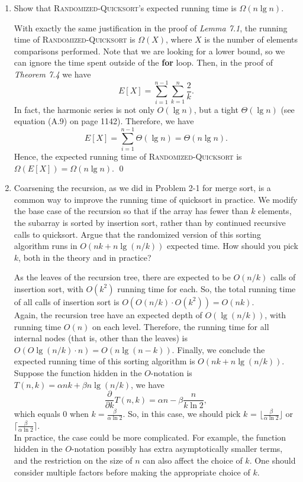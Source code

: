 \documentclass[12pt,reqno]{amsart}
\newif\ifanswer
\begin{document}
\begin{enumerate}[1.]
\item Show that \textsc{Randomized-Quicksort}'s expected running time is $\Omega(n\lg{n})$.

\ifanswer
{}
With exactly the same justification in the proof of \textit{Lemma 7.1}, the running time of \textsc{Randomized-Quicksort} is $\Omega(X)$, where $X$ is the number of elements comparisons performed. Note that we are looking for a lower bound, so we can ignore the time spent outside of the \textbf{for} loop. Then, in the proof of \textit{Theorem 7.4} we have
$$
E[X] = \sum_{i = 1}^{n - 1}\sum_{k = 1}^{n}{\frac{2}{k}}.
$$
In fact, the harmonic series is not only $O(\lg{n})$, but a tight $\Theta(\lg{n})$ (see equation (A.9) on page 1142). Therefore, we have
$$
E[X] = \sum_{i = 1}^{n - 1}{\Theta(\lg{n})} = \Theta{(n\lg{n})}.
$$
Hence, the expected running time of \textsc{Randomized-Quicksort} is $\Omega(E[X]) = \Omega{(n\lg{n})}$. \qed
\vspace{1cm}



\item Coarsening the recursion, as we did in Problem 2-1 for merge sort, is a common way to improve the running time of quicksort in practice. We modify the base case of the recursion so that if the array has fewer than $k$ elements, the subarray is sorted by insertion sort, rather than by continued recursive calls to quicksort. Argue that the randomized version of this sorting algorithm runs in $O(nk + n\lg{(n/k)})$ expected time. How should you pick $k$, both in the theory and in practice?

\ifanswer
{}
As the leaves of the recursion tree, there are expected to be $O(n/k)$ calls of insertion sort, with $O(k^2)$ running time for each. So, the total running time of all calls of insertion sort is $O(O(n/k)\cdot O(k^2)) = O(nk)$.\\
Again, the recursion tree have an expected depth of $O(\lg{(n/k)})$, with running time $O(n)$ on each level. Therefore, the running time for all internal nodes (that is, other than the leaves) is $O(O{\lg{(n/k)}\cdot n}) = O(n\lg{(n - k)})$. Finally, we conclude the expected running time of this sorting algorithm is $O(nk + n\lg{(n/k)})$.\\
Suppose the function hidden in the $O$-notation is $T(n, k) = \alpha nk + \beta n\lg{(n / k)}$, we have
$$
\frac{\partial}{\partial k}{T(n, k)} = \alpha n - \beta\frac{n}{k\ln{2}},
$$
which equals $0$ when $k = \frac{\beta}{\alpha\ln{2}}$. So, in this case, we should pick $k$ = $\lfloor\frac{\beta}{\alpha\ln{2}}\rfloor$ or $\lceil\frac{\beta}{\alpha\ln{2}}\rceil$.\\
In practice, the case could be more complicated. For example, the function hidden in the $O$-notation possibly has extra asymptotically smaller terms, and the restriction on the size of $n$ can also affect the choice of $k$. One should consider multiple factors before making the appropriate choice of $k$.
\vspace{1cm}




\end{enumerate}
\end{document}
